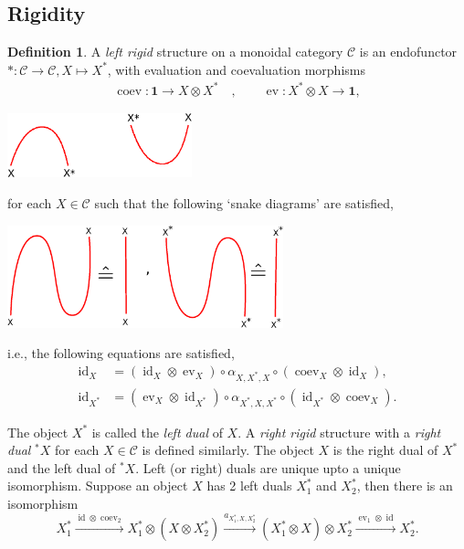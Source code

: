 \documentclass[11pt]{book}
\theoremstyle{Rem}
\theoremstyle{definition}
\newtheorem{Def}[theorem]{Definition}
\numberwithin{equation}{section}
\newcommand\id{\operatorname{id}}
\newcommand\C{\mathcal C}
\newcommand\one{\mathbf{1}}
\newcommand\ev{\operatorname{ev}}
\newcommand\coev{\operatorname{coev}}
\begin{document}
\subsection{Rigidity}
\begin{Def}
 A \textit{left rigid} structure on a monoidal category $\C$ is an endofunctor $*:\C \rightarrow \C, X\mapsto X^*$, with evaluation and coevaluation morphisms \begin{align}
	\coev: \one \rightarrow X\otimes X^*\quad, \quad \quad \ev:X^*\otimes X \rightarrow \one  
	,
\end{align}
\begin{center}
\includegraphics[width=0.4\textwidth]{duals.eps}
\end{center}
for each $X \in \C$ such that the following `snake diagrams' are satisfied,

\begin{center}
\includegraphics[width=0.6\textwidth]{snake.eps}
\end{center}
i.e., the following equations are satisfied, \begin{align}
	\label{rigid2}\id_X &= (\id_X \otimes \ev_X) \circ\alpha_{X, X^*, X}\circ(\coev_{X} \otimes \id_X),\\ \label{rigid1}\id_{X^*} &= (\ev_X\otimes \id_{X^*})\circ \alpha_{X^*, X,  X^*}\circ(\id_{X^*}\otimes \coev_X)
	.
\end{align}

\end{Def}

The object $X^*$ is called the \textit{left dual} of $X$. A \textit{right rigid} structure with a \textit{right dual} ${}^*X$ for each $X\in \C$ is defined similarly. The object $X$ is the right dual of $X^*$ and the left dual of ${}^*X$. Left (or right) duals are unique upto a unique isomorphism. Suppose an object $X$ has 2 left duals $X_1^*$ and $X_2^*$, then there is an isomorphism \begin{equation}
	X_1^* \xrightarrow{\id \otimes \coev_2} X_1^* \otimes (X\otimes X_2^*) \xrightarrow{a_{X_1^*, X, X_2^*}} (X_1^* \otimes X ) \otimes X_2^* \xrightarrow{\ev_1 \otimes \id} X_2^*.
\end{equation}\\
\end{document}
